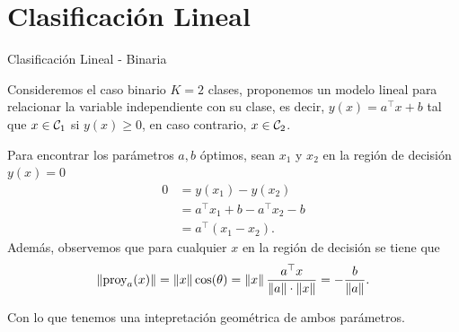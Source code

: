 \documentclass[9pt, handout]{beamer}
\begin{document}
\section{Clasificación Lineal}

\begin{frame}{Clasificación Lineal - Binaria}

Consideremos el caso binario $K=2$ clases, proponemos un modelo lineal para relacionar la variable independiente con su clase, es decir, $y(x) = a^\top x+b$ tal que  $x \in {\mathcal C}_1$ si $y(x) \geq 0$, en caso contrario,  $x \in {\mathcal C}_2$. \pause

Para encontrar los parámetros $a,b$ óptimos, sean $x_1$ y $x_2$ en la región de decisión $y(x)=0$ \pause  
\begin{align*}
  0 &= y(x_1) - y(x_2) \nonumber\\ 
    &= a^\top x_1 + b - a^\top x_2 - b \nonumber\\ 
    &= a^\top (x_1-x_2).
\end{align*}
\pause
Además, observemos que para cualquier $x$ en la región de decisión se tiene que 
\begin{equation*}
  \left\lVert\text{proy}_a(x)\right\rVert = \left\lVert x\right\rVert\cos(\theta) = \left\lVert x\right\rVert \frac{a^\top x}{\left\lVert a\right\rVert\cdot\left\lVert x\right\rVert} = -\frac{b}{\left\lVert a\right\rVert}.
\end{equation*}

Con lo que tenemos una intepretación geométrica de ambos parámetros. 

\end{frame}
\end{document}
